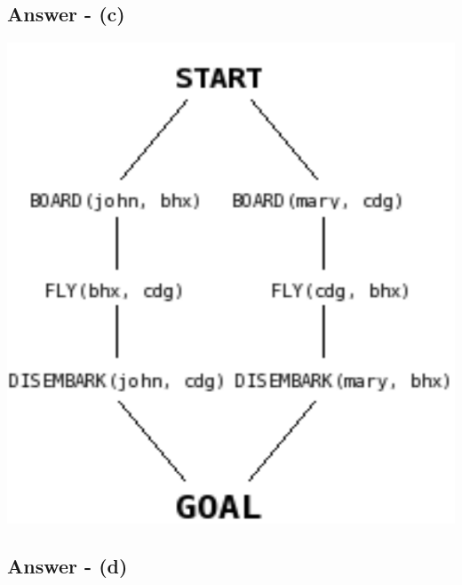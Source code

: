 \documentclass{article}
\begin{document}
\subsection{Answer - (c)}
\includegraphics{IntroToAIE2PartialPlan.png}
\subsection{Answer - (d)}
\end{document}
